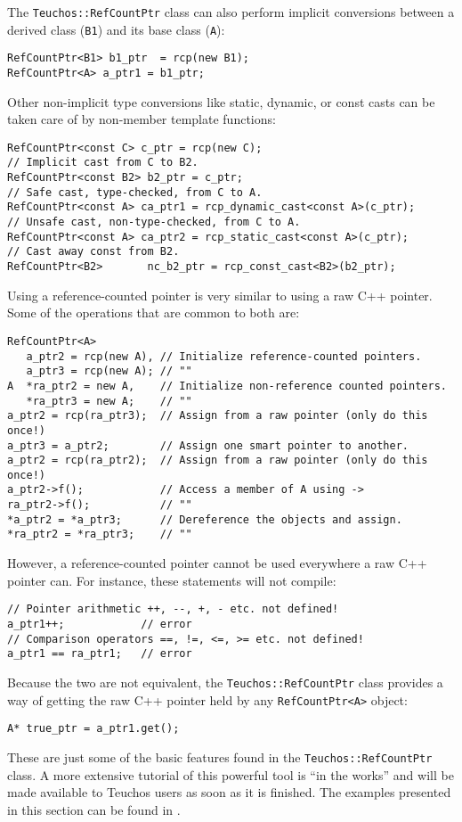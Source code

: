 The {\tt Teuchos::RefCountPtr} class can also perform implicit conversions between a derived
class ({\tt B1}) and its base class ({\tt A}):

{\small
\begin{verbatim}
RefCountPtr<B1> b1_ptr  = rcp(new B1);
RefCountPtr<A> a_ptr1 = b1_ptr;
\end{verbatim}}

\noindent Other non-implicit type conversions like static, dynamic, or const casts
can be taken care of by non-member template functions:

{\small
\begin{verbatim}
RefCountPtr<const C> c_ptr = rcp(new C);
// Implicit cast from C to B2.
RefCountPtr<const B2> b2_ptr = c_ptr;                              
// Safe cast, type-checked, from C to A.
RefCountPtr<const A> ca_ptr1 = rcp_dynamic_cast<const A>(c_ptr); 
// Unsafe cast, non-type-checked, from C to A.
RefCountPtr<const A> ca_ptr2 = rcp_static_cast<const A>(c_ptr);  
// Cast away const from B2.
RefCountPtr<B2>       nc_b2_ptr = rcp_const_cast<B2>(b2_ptr);           
\end{verbatim}}

Using a reference-counted pointer is very similar to using a raw C++ pointer.  Some
of the operations that are common to both are:
{\small
\begin{verbatim}
RefCountPtr<A>
   a_ptr2 = rcp(new A), // Initialize reference-counted pointers.
   a_ptr3 = rcp(new A); // ""
A  *ra_ptr2 = new A,    // Initialize non-reference counted pointers.
   *ra_ptr3 = new A;    // ""
a_ptr2 = rcp(ra_ptr3);  // Assign from a raw pointer (only do this once!)
a_ptr3 = a_ptr2;        // Assign one smart pointer to another.
a_ptr2 = rcp(ra_ptr2);  // Assign from a raw pointer (only do this once!)
a_ptr2->f();            // Access a member of A using ->
ra_ptr2->f();           // ""
*a_ptr2 = *a_ptr3;      // Dereference the objects and assign.
*ra_ptr2 = *ra_ptr3;    // ""
\end{verbatim}}

\noindent However, a reference-counted pointer cannot be used everywhere a raw C++ pointer
can.  For instance, these statements will not compile:
{\small
\begin{verbatim}
// Pointer arithmetic ++, --, +, - etc. not defined!
a_ptr1++;            // error  
// Comparison operators ==, !=, <=, >= etc. not defined!
a_ptr1 == ra_ptr1;   // error 
\end{verbatim}}

\noindent Because the two are not equivalent, the {\tt Teuchos::RefCountPtr} class provides 
a way of getting the raw C++ pointer held by any {\tt RefCountPtr<A>} object:
{\small
\begin{verbatim}
A* true_ptr = a_ptr1.get();
\end{verbatim}}
These are just some of the basic features found in the {\tt Teuchos::RefCountPtr} class.  
A more extensive tutorial of this powerful tool is ``in the works'' and will be made available
to Teuchos users as soon as it is finished.  The examples presented in this section can be found in
.  

